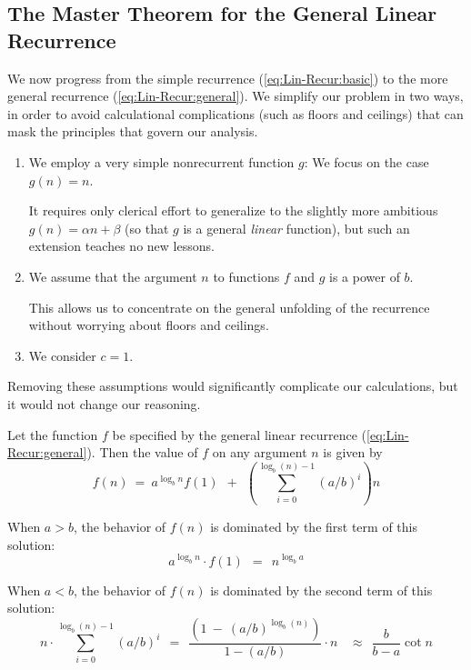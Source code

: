 \subsection{The Master Theorem for the General Linear Recurrence} 
\label{sec:linear-recurrence-general}

We now progress from the simple recurrence (\ref{eq:Lin-Recur:basic}) to
the more general recurrence (\ref{eq:Lin-Recur:general}).  We simplify
our problem in two ways, in order to avoid calculational complications
(such as floors and ceilings) that can mask the principles that govern
our analysis.
\begin{enumerate}
\item
We employ a very simple nonrecurrent function $g$: We focus on the
case $g(n) = n$.

It requires only clerical effort to generalize to the slightly more
ambitious $g(n) = \alpha n + \beta$ (so that $g$ is a general {\em
  linear} function), but such an extension teaches no new lessons.
\item
We assume that the argument $n$ to functions $f$ and $g$ is a power of
$b$.

This allows us to concentrate on the general unfolding of the
recurrence without worrying about floors and ceilings.

\item We consider $c=1$.
\end{enumerate}
Removing these assumptions would significantly complicate our
calculations, but it would not change our reasoning.

\begin{theorem}
\label{thm:master-thm-genl}
Let the function $f$ be specified by the general linear recurrence
(\ref{eq:Lin-Recur:general}).  Then the value of $f$ on any argument
$n$ is given by
\[
f(n) \ = \ 
a^{\log_b n} f(1) \ \ + \ \ \left( \sum_{i=0}^{\log_b (n)-1} (a/b)^i \right) n
\]

\noindent
When $a > b$, the behavior of $f(n)$ is dominated by the first
term of this solution:
\[ a^{\log_b n} \cdot  f(1) \ \ = \ \ n^{\log_b a} \]

\noindent
When $a < b$, the behavior of $f(n)$ is dominated by the second
term of this solution:
\[
n \cdot \sum_{i=0}^{\log_b (n)-1} (a/b)^i
  \ \ = \ \
\frac{\left( 1 \ - \  (a/b)^{\log_b (n)} \right)}{1- (a/b)} \cdot n \ \
  \ \ \approx \ \
\frac{b}{b - a} \cot n
\]
\end{theorem}

